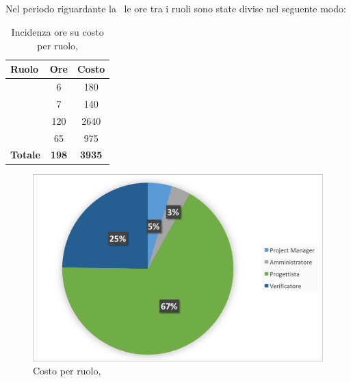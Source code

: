 \newpage
\subsection{\PA}
Nel periodo riguardante la \PA\ le ore tra i ruoli sono state divise nel seguente modo:

\begin{table}[h]
	\begin{center}
		\begin{tabular}{|l|c|c|}
			\hline
			\textbf{Ruolo}	& \textbf{Ore} &	\textbf{Costo}	 \\
			\hline
			\textit{\Pm}	&	6	&	180\\
			\hline
			\textit{\Am}	&	7	&	140\\
			\hline
			\textit{\Prog}	&	120	&	2640\\
			\hline
			\textit{\Ver}	&	65	&	975\\
			\hline
			\textbf{Totale}	&	\textbf{198}	&	\textbf{3935}\\
			\hline
		\end{tabular}
	\end{center}
	\caption{Incidenza ore su costo per ruolo, \PA}
\end{table}

\begin{figure}[H]
	\centering 
	\includegraphics[scale=0.7]{Immagini/GraficiTorteSezione6/PA.png}
	\caption{Costo per ruolo, \PA}
\end{figure}

\newpage
